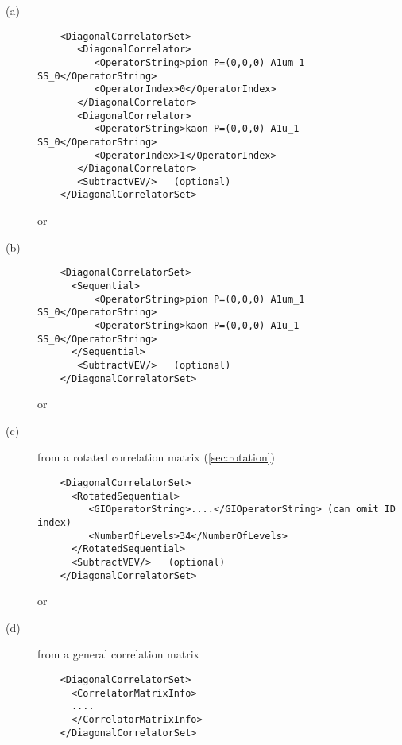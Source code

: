 \documentclass[12pt]{article}
\begin{document}
\begin{description}
\item[(a)]
\begin{verbatim}
    <DiagonalCorrelatorSet>                                                
       <DiagonalCorrelator>                                                
          <OperatorString>pion P=(0,0,0) A1um_1 SS_0</OperatorString>      
          <OperatorIndex>0</OperatorIndex>                                 
       </DiagonalCorrelator>                                               
       <DiagonalCorrelator>                                                
          <OperatorString>kaon P=(0,0,0) A1u_1 SS_0</OperatorString>       
          <OperatorIndex>1</OperatorIndex>                                 
       </DiagonalCorrelator>                                               
       <SubtractVEV/>   (optional)                                         
    </DiagonalCorrelatorSet>                                               
\end{verbatim}
or
\item[(b)]
\begin{verbatim}
    <DiagonalCorrelatorSet>                                                
      <Sequential>                                                         
          <OperatorString>pion P=(0,0,0) A1um_1 SS_0</OperatorString>      
          <OperatorString>kaon P=(0,0,0) A1u_1 SS_0</OperatorString>       
      </Sequential>                                                        
       <SubtractVEV/>   (optional)                                         
    </DiagonalCorrelatorSet>                                               
\end{verbatim}
or
\item[(c)] from a rotated correlation matrix (\ref{sec:rotation})
\begin{verbatim}
    <DiagonalCorrelatorSet>                                               
      <RotatedSequential>                                                 
         <GIOperatorString>....</GIOperatorString> (can omit ID index)    
         <NumberOfLevels>34</NumberOfLevels>                              
      </RotatedSequential>                                                
      <SubtractVEV/>   (optional)                                         
    </DiagonalCorrelatorSet>                                               
\end{verbatim}
or
\item[(d)] from a general correlation matrix
\begin{verbatim}
    <DiagonalCorrelatorSet>                                                
      <CorrelatorMatrixInfo>                                               
      ....                                                                 
      </CorrelatorMatrixInfo>                                              
    </DiagonalCorrelatorSet>                                               
\end{verbatim}
\end{description}
\end{document}

